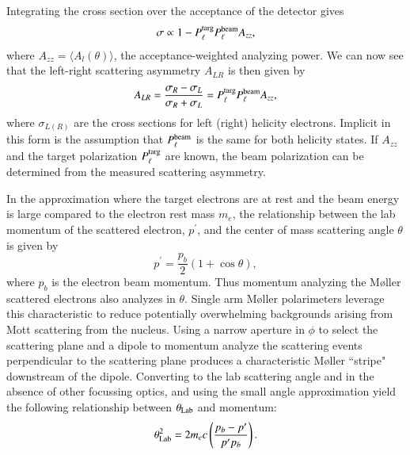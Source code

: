 \documentclass[preprint,12pt]{elsarticle}
\begin{document}
Integrating the cross section over the acceptance of the detector gives 
\[
\sigma \propto1-P^{\rm targ}_{\ell}P^{\rm beam}_{\ell}A_{zz},
\]
where $A_{zz}=\langle A_l(\theta)\rangle$, the acceptance-weighted analyzing power. We can now see that the left-right scattering asymmetry $A_{LR}$ is then given by 
\begin{equation}
A_{LR}=\frac{\sigma_R-\sigma_L}{\sigma_R+\sigma_L}=P^{\rm targ}_{\ell}P^{\rm beam}_{\ell}A_{zz},
\label{eq:A_LR}
\end{equation}
where $\sigma_{L(R)}$ are the cross sections for left (right) helicity electrons. Implicit in this form is the assumption that $P_\ell^{\rm beam}$ is the same for both helicity states. If $A_{zz}$ and the target polarization $P_{\ell}^{\rm targ}$ are known, the beam polarization can be determined from the measured scattering asymmetry. 

In the approximation where the target electrons are at rest and the beam energy is large compared to the electron rest mass $m_e$, the relationship between the lab momentum of the scattered electron, $p^{\prime}$, and the center of mass scattering angle $\theta$ is given by 
\begin{equation}
p^{\prime}=\frac{p_b}{2}\left(1+\cos\theta \right),
\label{eq:pvstheta}
\end{equation}
where $p_b$ is the electron beam momentum. Thus momentum analyzing the M\o ller scattered electrons also analyzes in $\theta$. Single arm M\o ller polarimeters leverage this characteristic to reduce potentially overwhelming backgrounds arising from Mott scattering from the nucleus. Using a narrow aperture in $\phi$ to select the scattering plane and a dipole to momentum analyze the scattering events perpendicular to the scattering plane produces a characteristic M\o ller ``stripe" downstream of the dipole. Converting to the lab scattering angle and in the absence of other focussing optics, and using the small angle approximation yield the following relationship between $\theta_{\rm Lab}$ and  momentum:
\begin{equation}
\theta^2_{\rm Lab}=2m_ec\left(\frac{p_b-p^{\prime}}{p^{\prime}p_b}\right).
\label{eq:theta_lab}
\end{equation}
\end{document}
